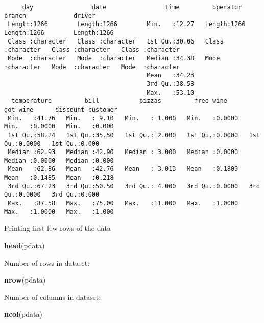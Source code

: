 \documentclass[
]{article}
\newenvironment{Shaded}{\begin{snugshade}}{\end{snugshade}}
\newcommand{\FunctionTok}[1]{\textcolor[rgb]{0.13,0.29,0.53}{\textbf{#1}}}
\newcommand{\NormalTok}[1]{#1}
\begin{document}
\begin{verbatim}
     day                date                time         operator            branch             driver         
 Length:1266        Length:1266        Min.   :12.27   Length:1266        Length:1266        Length:1266       
 Class :character   Class :character   1st Qu.:30.06   Class :character   Class :character   Class :character  
 Mode  :character   Mode  :character   Median :34.38   Mode  :character   Mode  :character   Mode  :character  
                                       Mean   :34.23                                                           
                                       3rd Qu.:38.58                                                           
                                       Max.   :53.10                                                           
  temperature         bill           pizzas         free_wine         got_wine      discount_customer
 Min.   :41.76   Min.   : 9.10   Min.   : 1.000   Min.   :0.0000   Min.   :0.0000   Min.   :0.000    
 1st Qu.:58.24   1st Qu.:35.50   1st Qu.: 2.000   1st Qu.:0.0000   1st Qu.:0.0000   1st Qu.:0.000    
 Median :62.93   Median :42.90   Median : 3.000   Median :0.0000   Median :0.0000   Median :0.000    
 Mean   :62.86   Mean   :42.76   Mean   : 3.013   Mean   :0.1809   Mean   :0.1485   Mean   :0.218    
 3rd Qu.:67.23   3rd Qu.:50.50   3rd Qu.: 4.000   3rd Qu.:0.0000   3rd Qu.:0.0000   3rd Qu.:0.000    
 Max.   :87.58   Max.   :75.00   Max.   :11.000   Max.   :1.0000   Max.   :1.0000   Max.   :1.000    
\end{verbatim}

Printing first few rows of the data

\begin{Shaded}
\begin{Highlighting}[]
\FunctionTok{head}\NormalTok{(pdata)}
\end{Highlighting}
\end{Shaded}

Number of rows in dataset:

\begin{Shaded}
\begin{Highlighting}[]
\FunctionTok{nrow}\NormalTok{(pdata)}
\end{Highlighting}
\end{Shaded}

Number of columns in dataset:

\begin{Shaded}
\begin{Highlighting}[]
\FunctionTok{ncol}\NormalTok{(pdata)}
\end{Highlighting}
\end{Shaded}
\end{document}
